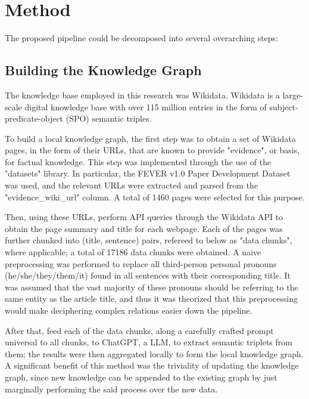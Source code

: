 \documentclass[11pt]{article}
\begin{document}
\section{Method}
The proposed pipeline could be decomposed into several overarching steps:

\subsection{Building the Knowledge Graph}
The knowledge base employed in this research was Wikidata. Wikidata is a large-scale digital knowledge base with over 115 million entries in the form of subject-predicate-object (SPO) semantic triples.

To build a local knowledge graph, the first step was to obtain a set of Wikidata pages, in the form of their URLs, that are known to provide "evidence", or basis, for factual knowledge. This step was implemented through the use of the "datasets" library. In particular, the FEVER v1.0 Paper Development Dataset\cite{fever} was used, and the relevant URLs were extracted and parsed from the "evidence\_wiki\_url" column. A total of 1460 pages were selected for this purpose. 

Then, using these URLs, perform API queries through the Wikidata API to obtain the page summary and title for each webpage. Each of the pages was further chunked into (title, sentence) pairs, refereed to below as "data chunks", where applicable; a total of 17186 data chunks were obtained. A naive preprocessing was performed to replace all third-person personal pronouns (he/she/they/them/it) found in all sentences with their corresponding title. It was assumed that the vast majority of these pronouns should be referring to the same entity as the article title, and thus it was theorized that this preprocessing would make deciphering complex relations easier down the pipeline.

After that, feed each of the data chunks, along a carefully crafted prompt universal to all chunks, to ChatGPT, a LLM, to extract semantic triplets from them; the results were then aggregated locally to form the local knowledge graph. A significant benefit of this method was the triviality of updating the knowledge graph, since new knowledge can be appended to the existing graph by just marginally performing the said process over the new data. 
\end{document}
